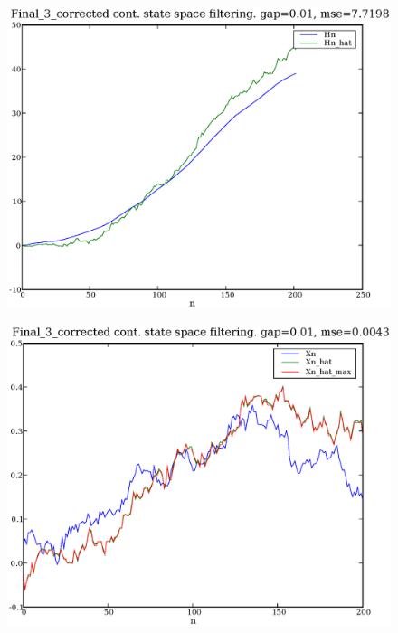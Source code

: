 \documentclass[a4paper,10pt]{article}
\begin{document}
\begin{figure}
\includegraphics[width=1\textwidth]{Final_3_corrected_Hn_Hn_hat_gap_0.01.eps}
\caption{}\label{f6}
\end{figure}

\begin{figure}
\includegraphics[width=1\textwidth]{Final_3_corrected_Xn_Xn_hat_Xn_hat_max_gap_0.01.eps}
\caption{}\label{f7}
\end{figure}
\end{document}
